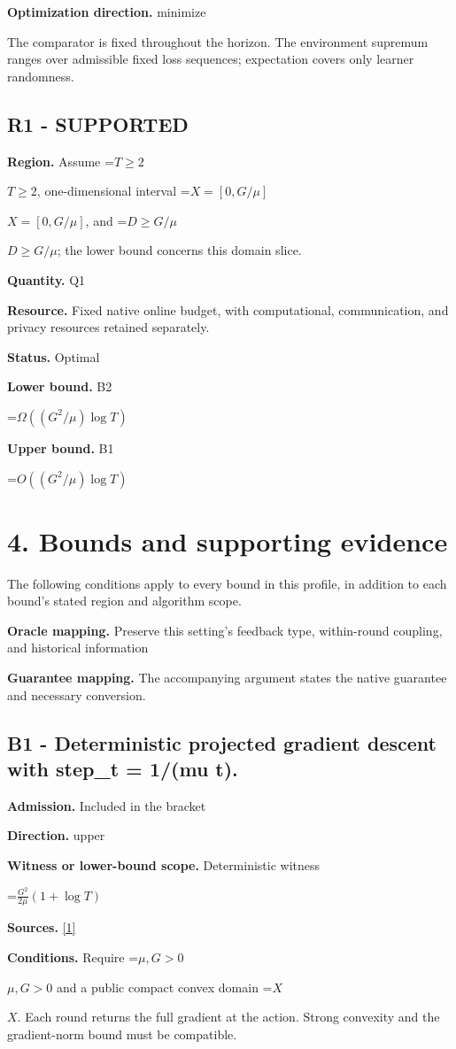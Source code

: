 \documentclass[10pt,a4paper]{article}
\newcommand{\AtlasMath}[1]{\par\begingroup\centering\setbox0=\hbox{$\displaystyle #1$}\ifdim\wd0>1.4\linewidth\typeout{ATLAS WIDE FORMULA: \the\wd0}\fi\ifdim\wd0>\linewidth\resizebox{\linewidth}{!}{\box0}\else\box0\fi\par\endgroup}
\newcommand{\AtlasInlineMath}[1]{\begingroup\setbox0=\hbox{$#1$}\ifdim\wd0>.4\linewidth\endgroup\AtlasMath{#1}\else\endgroup$#1$\fi}
\begin{document}
\textbf{Optimization direction.} minimize

The comparator is fixed throughout the horizon. The environment supremum ranges over admissible fixed loss sequences; expectation covers only learner randomness.

\subsection{R1 - SUPPORTED}
\textbf{Region.} Assume \AtlasInlineMath{T\ge 2}, one-dimensional interval \AtlasInlineMath{X=[0,G/\mu]}, and \AtlasInlineMath{D\ge G/\mu}; the lower bound concerns this domain slice.

\textbf{Quantity.} Q1

\textbf{Resource.} Fixed native online budget, with computational, communication, and privacy resources retained separately.

\textbf{Status.} Optimal

\textbf{Lower bound.} B2

\AtlasMath{\Omega((G^2/\mu)\log T)}
\textbf{Upper bound.} B1

\AtlasMath{O((G^2/\mu)\log T)}
\section{4. Bounds and supporting evidence}
The following conditions apply to every bound in this profile, in addition to each bound's stated region and algorithm scope.

\textbf{Oracle mapping.} Preserve this setting's feedback type, within-round coupling, and historical information

\textbf{Guarantee mapping.} The accompanying argument states the native guarantee and necessary conversion.

\subsection{B1 - Deterministic projected gradient descent with step\_t = 1/(mu t).}
\textbf{Admission.} Included in the bracket

\textbf{Direction.} upper

\textbf{Witness or lower-bound scope.} Deterministic witness

\AtlasMath{\frac{G^2}{2\mu}(1+\log T)}
\textbf{Sources.} \href{https://jmlr.org/papers/v15/hazan14a.html}{[1]}

\textbf{Conditions.} Require \AtlasInlineMath{\mu,G>0} and a public compact convex domain \AtlasInlineMath{X}. Each round returns the full gradient at the action. Strong convexity and the gradient-norm bound must be compatible.
\end{document}
